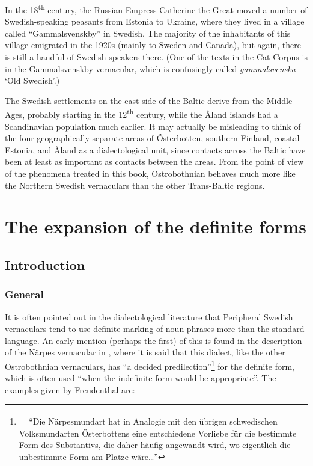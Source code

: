 \begin{styleBodytextC}
In the 18\textsuperscript{th} century, the Russian Empress Catherine the Great moved a number of Swedish-speaking peasants from Estonia to Ukraine, where they lived in a village called “Gammalsvenskby” in Swedish. The majority of the inhabitants of this village emigrated in the 1920s (mainly to Sweden and Canada), but again, there is still a handful of Swedish speakers there. (One of the texts in the Cat Corpus is in the Gammalsvenskby vernacular, which is confusingly called \textit{gammalsvenska} ‘Old Swedish’.)

\end{styleBodytextC}

\begin{styleBodytextC}
The Swedish settlements on the east side of the Baltic derive from the Middle Ages, probably starting in the 12\textsuperscript{th} century, while the Åland islands had a Scandinavian population much earlier. It may actually be misleading to think of the four geographically separate areas of Österbotten, southern Finland, coastal Estonia, and Åland as a dialectological unit, since contacts across the Baltic have been at least as important as contacts between the areas. From the point of view of the phenomena treated in this book, Ostrobothnian behaves much more like the Northern Swedish vernaculars than the other Trans-Baltic regions.

\end{styleBodytextC}

\chapter[The expansion of the definite forms]{The expansion of the definite forms}
\label{bkm:Ref160007852}\label{bkm:Ref156803843}\label{bkm:Ref155077895}\section{Introduction}
\subsection{\rmfamily General}

\begin{styleBodyTextFirst}
It is often pointed out in the dialectological literature that Peripheral Swedish vernaculars tend to use definite marking of noun phrases more than the standard language. An early mention (perhaps the first) of this is found in the description of the Närpes vernacular in \citet[137]{Freudenthal1878}, where it is said that this dialect, like the other Ostrobothnian vernaculars, has “a decided predilection”\footnote{\textsuperscript{\ \ } “Die Närpesmundart hat in Analogie mit den übrigen schwedischen Volksmundarten Österbottens eine entschiedene Vorliebe für die bestimmte Form des Substantivs, die daher häufig angewandt wird, wo eigentlich die unbestimmte Form am Platze wäre…”} for the definite form, which is often used “when the indefinite form would be appropriate”. The examples given by Freudenthal are:

\end{styleBodyTextFirst}


